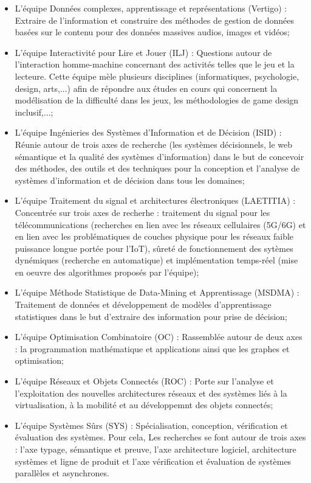 \documentclass{article}
\begin{document}
	\begin{itemize}
		\item L'équipe Données complexes, apprentissage et représentations (Vertigo) : Extraire de l'information et construire des méthodes de gestion de données basées sur le contenu pour des données massives audios, images et vidéos;
		\item L'équipe Interactivité pour Lire et Jouer (ILJ) : Questions autour de l'interaction homme-machine concernant des activités telles que le jeu et la lecteure. Cette équipe mèle plusieurs disciplines (informatiques, psychologie, design, arts,...) afin de répondre aux études en cours qui concernent la modélisation de la difficulté dans les jeux, les méthodologies de game design inclusif,...;
		\item L'équipe Ingénieries des Systèmes d'Information et de Décision (ISID) : Réunie autour de trois axes de recherche (les systèmes décisionnels, le web sémantique et la qualité des systèmes d'information) dans le but de concevoir des méthodes, des outils et des techniques	pour la conception et l'analyse de systèmes d'information et de décision dans tous les domaines;
		\item L'équipe Traitement du signal et architectures électroniques (LAETITIA) : Concentrée sur trois axes de recherhe : traitement du signal pour les télécommunications (recherches en lien avec les réseaux cellulaires (5G/6G) et en lien avec les problématiques de couches physique pour les réseaux faible puissance longue portée pour l'IoT), sûreté de fonctionnement des sytèmes dynémiques (recherche en automatique) et implémentation temps-réel (mise en oeuvre des algorithmes proposés par l'équipe);
		\item L'équipe Méthode Statistique de Data-Mining et Apprentissage (MSDMA) : Traitement de données et développement de modèles d'apprentissage statistiques dans le but d'extraire des information pour prise de décision;
		\item L'équipe Optimisation Combinatoire (OC) : Rassemblée autour de deux axes : la programmation mathématique et applications ainsi que les graphes et optimisation;
		\item L'équipe Réseaux et Objets Connectés (ROC) : Porte sur l'analyse et l'exploitation des nouvelles architectures réseaux et des systèmes liés à la virtualisation, à la mobilité et au développemnt des objets connectés;
		\item L'équipe Systèmes Sûrs (SYS) : Spécialisation, conception, vérification et évaluation des systèmes. Pour cela, Les recherches se font autour de trois axes : l'axe typage, sémantique et preuve, l'axe architecture logiciel, architecture systèmes et ligne de produit et l'axe vérification  et évaluation de systèmes parallèles et asynchrones.
	\end{itemize}
\end{document}
